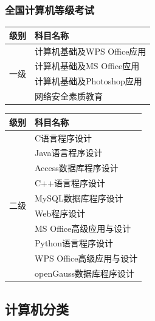 \begin{frame}
    \frametitle{全国计算机等级考试}
    \begin{minipage}{0.48\linewidth}
\begin{table}[]
    \begin{tabular}{@{}cl@{}}
    \toprule
    \multicolumn{1}{l}{\textbf{级别}} & \textbf{科目名称}      \\ \midrule
    \multirow{4}{*}{一级}             & 计算机基础及WPS Office应用 \\
                                    & 计算机基础及MS Office应用  \\
                                    & 计算机基础及Photoshop应用  \\
                                    & 网络安全素质教育           \\ \bottomrule
    \end{tabular}
    \end{table}
    \end{minipage}\hfill
    \begin{minipage}{0.48\linewidth}
\begin{table}[]
    \begin{tabular}{@{}ll@{}}
    \toprule
    \textbf{级别}          & \textbf{科目名称}     \\ \midrule
    \multirow{10}{*}{二级} & C语言程序设计           \\
                         & Java语言程序设计        \\
                         & Access数据库程序设计     \\
                         & C++语言程序设计         \\
                         & MySQL数据库程序设计      \\
                         & Web程序设计           \\
                         & MS Office高级应用与设计  \\
                         & Python语言程序设计      \\
                         & WPS Office高级应用与设计 \\
                         & openGauss数据库程序设计  \\ \bottomrule
    \end{tabular}
    \end{table}
    \end{minipage}
\end{frame}


\subsection{计算机分类}


